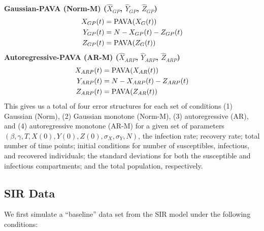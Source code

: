 \documentclass[12pt]{article}
\begin{document}
\noindent \textbf{Gaussian-PAVA (Norm-M) ($\hat{X}_{GP}$, $\hat{Y}_{GP}$, $\hat{Z}_{GP}$)}
\begin{align*}
 X_{GP}(t) &= \textnormal{PAVA}(X_G(t)) \\
  Y_{GP}(t) &= N - X_{GP}(t) - Z_{GP}(t) \\
  Z_{GP}(t) &= \textnormal{PAVA}(Z_G(t)) \\
\end{align*}
\textbf{Autoregressive-PAVA (AR-M) ($\hat{X}_{ARP}$, $\hat{Y}_{ARP}$, $\hat{Z}_{ARP}$)}
\begin{align*}
  X_{ARP}(t) &= \textnormal{PAVA}(X_{AR}(t)) \\
  Y_{ARP}(t) &= N - X_{ARP}(t) - Z_{ARP}(t) \\
  Z_{ARP}(t) &= \textnormal{PAVA}(Z_{AR}(t)) 
\end{align*}
This gives us a total of four error structures for each set of conditions  (1) Gaussian (Norm), (2) Gaussian monotone (Norm-M),  (3) autoregressive (AR), and (4) autoregressive monotone (AR-M) for a given set of parameters $\left (\beta, \gamma, T, X(0), Y(0), Z(0), \sigma_X, \sigma_Y, N \right )$, the infection rate; recovery rate; total number of time points; initial conditions for number of susceptibles, infectious, and recovered individuals; the standard deviations for both the susceptible and infectious compartments; and the total population, respectively.


\subsection{SIR Data}

We first simulate a ``baseline'' data set from the SIR model under the following conditions: 
\end{document}
